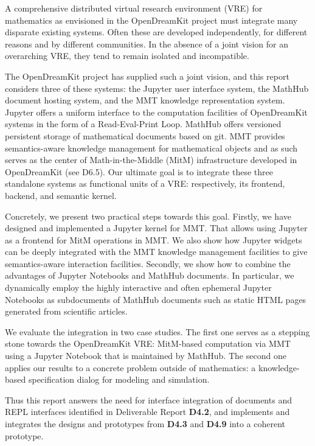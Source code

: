 A comprehensive distributed virtual research environment (VRE) for mathematics as envisioned in the OpenDreamKit project must integrate many disparate existing systems.
Often these are developed independently, for different reasons and by different communities.
In the absence of a joint vision for an overarching VRE, they tend to remain isolated and incompatible.

The OpenDreamKit project has supplied such a joint vision, and this report considers three of these systems: the Jupyter user interface system, the MathHub document hosting system, and the MMT knowledge representation system.
Jupyter offers a uniform interface to the computation facilities of OpenDreamKit systems in the form of a Read-Eval-Print Loop.
MathHub offers versioned persistent storage of mathematical documents based on git.
MMT provides semantics-aware knowledge management for mathematical objects and as such serves as the center of Math-in-the-Middle (MitM) infrastructure developed in OpenDreamKit (see D6.5).
Our ultimate goal is to integrate these three standalone systems as functional units of a VRE: respectively, its frontend, backend, and semantic kernel.

Concretely, we present two practical steps towards this goal.
Firstly, we have designed and implemented a Jupyter kernel for MMT.
That allows using Jupyter as a frontend for MitM operations in MMT.
We also show how Jupyter widgets can be deeply integrated with the MMT knowledge management facilities to give semantics-aware interaction facilities.
Secondly, we show how to combine the advantages of Jupyter Notebooks and MathHub documents.
In particular, we dynamically employ the highly interactive and often ephemeral Jupyter Notebooks as subdocuments of MathHub documents such as static HTML pages generated from scientific articles.

We evaluate the integration in two case studies.
The first one serves as a stepping stone towards the OpenDreamKit VRE: MitM-based computation via MMT using a Jupyter Notebook that is maintained by MathHub.
The second one applies our results to a concrete problem outside of mathematics: a knowledge-based specification dialog for modeling and simulation.

Thus this report answers the need for interface integration of documents and REPL interfaces identified in Deliverable Report \textbf{D4.2}, and implements and integrates the designs and prototypes from \textbf{D4.3} and \textbf{D4.9} into a coherent prototype. 
